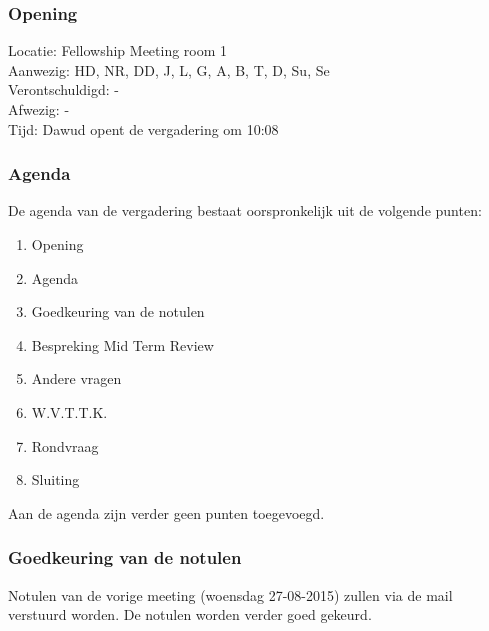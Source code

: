 \subsubsection{Opening}
Locatie: Fellowship Meeting room 1\\
Aanwezig: HD, NR, DD, J, L, G, A, B, T, D, Su, Se\\
Verontschuldigd: - \\
Afwezig: - \\
Tijd: Dawud opent de vergadering om 10:08\\

\subsubsection{Agenda}
De agenda van de vergadering bestaat oorspronkelijk uit de volgende punten:
\begin{enumerate}
\item Opening
\item Agenda
\item Goedkeuring van de notulen
\item Bespreking Mid Term Review
\item Andere vragen
\item W.V.T.T.K.
\item Rondvraag
\item Sluiting
\end{enumerate}

Aan de agenda zijn verder geen punten toegevoegd.

\subsubsection{Goedkeuring van de notulen}
Notulen van de vorige meeting (woensdag 27-08-2015) zullen via de mail verstuurd worden.
De notulen worden verder goed gekeurd.


